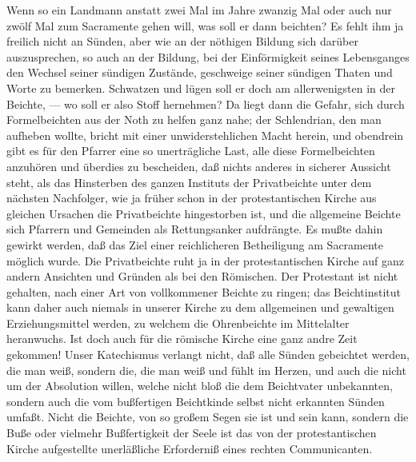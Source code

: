 Wenn so ein Landmann anstatt zwei Mal im Jahre zwanzig Mal oder auch nur zwölf Mal zum Sacramente gehen will, was soll er dann beichten? Es fehlt ihm ja freilich nicht an Sünden, aber wie an der nöthigen Bildung sich darüber auszusprechen, so auch an der Bildung, bei der Einförmigkeit seines Lebensganges den Wechsel seiner sündigen Zustände, geschweige seiner sündigen Thaten und Worte zu bemerken. Schwatzen und lügen soll er doch am allerwenigsten in der Beichte, — wo soll er also Stoff hernehmen? Da liegt dann die Gefahr, sich durch Formelbeichten aus der Noth zu helfen ganz nahe; der Schlendrian, den man aufheben wollte, bricht mit einer unwiderstehlichen Macht herein, und obendrein gibt es für den Pfarrer eine so unerträgliche Last, alle diese Formelbeichten anzuhören und überdies zu bescheiden, daß nichts anderes in sicherer Aussicht steht, als das Hinsterben des ganzen Instituts der Privatbeichte unter dem nächsten Nachfolger, wie ja früher schon in der
protestantischen Kirche aus gleichen Ursachen die Privatbeichte hingestorben ist, und die allgemeine Beichte sich Pfarrern und Gemeinden als Rettungsanker aufdrängte. Es mußte dahin gewirkt werden, daß das Ziel einer reichlicheren Betheiligung am Sacramente möglich wurde. Die Privatbeichte ruht ja in der protestantischen Kirche auf ganz andern Ansichten und Gründen als bei den Römischen. Der Protestant ist nicht gehalten, nach einer Art von vollkommener Beichte zu ringen; das Beichtinstitut kann daher auch niemals in unserer Kirche zu dem allgemeinen und gewaltigen Erziehungsmittel werden, zu welchem die Ohrenbeichte im Mittelalter heranwuchs. Ist doch auch für die römische Kirche eine ganz andre Zeit gekommen! Unser Katechismus verlangt nicht, daß alle Sünden gebeichtet werden, die man weiß, sondern die, die man weiß und fühlt im Herzen, und auch die nicht um der Absolution willen, welche nicht bloß die dem Beichtvater unbekannten, sondern auch die vom bußfertigen Beichtkinde selbst nicht erkannten Sünden umfaßt. Nicht die Beichte, von so großem Segen sie ist und sein kann, sondern die Buße oder vielmehr Bußfertigkeit der Seele ist das von der protestantischen Kirche aufgestellte unerläßliche Erforderniß eines rechten Communicanten.

